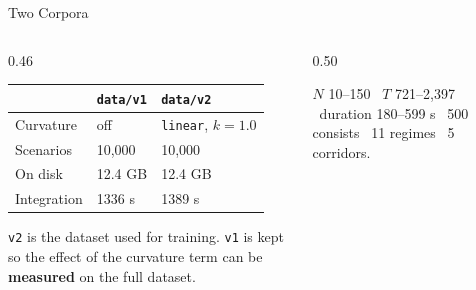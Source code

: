 \begin{frame}{Two Corpora}
  \vspace{0.4em}
  \begin{columns}[T,onlytextwidth]
    \begin{column}{0.46\textwidth}
      {\footnotesize
      \begin{tabular}{@{}lll@{}}
        \toprule
         & \texttt{data/v1} & \texttt{data/v2} \\
        \midrule
        Curvature   & off        & \texttt{linear}, $k = 1.0$ \\
        Scenarios   & 10,000     & 10,000 \\
        On disk     & 12.4 GB    & 12.4 GB \\
        Integration & 1336 s     & 1389 s \\
        \bottomrule
      \end{tabular}}

      \vspace{0.8em}
      {\footnotesize \texttt{v2} is the dataset used for training. \texttt{v1} is
      kept so the effect of the curvature term can be \textbf{measured} on the
      full dataset.}
    \end{column}
    \begin{column}{0.50\textwidth}
      \begin{center}
        \vspace{0.4em}
      \end{center}

      \vspace{0.5em}
      {\footnotesize $N$ 10--150 \textbullet\ $T$ 721--2,397 \textbullet\
       duration 180--599 s \textbullet\ 500 consists \textbullet\ 11 regimes
       \textbullet\ 5 corridors.}
    \end{column}
  \end{columns}
\end{frame}

